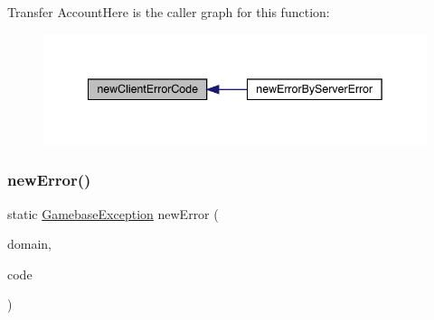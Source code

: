 Transfer AccountHere is the caller graph for this function\+:
\nopagebreak
\begin{figure}[H]
\begin{center}
\leavevmode
\includegraphics[width=342pt]{classcom_1_1toast_1_1android_1_1gamebase_1_1base_1_1_gamebase_error_ae1e31671405d6d3c4660aacf9d9dd3c5_icgraph}
\end{center}
\end{figure}
\mbox{\label{classcom_1_1toast_1_1android_1_1gamebase_1_1base_1_1_gamebase_error_a2d1d7646a1658d188ee9b65a25905661}} 
\subsubsection{\texorpdfstring{new\+Error()}{newError()}\hspace{0.1cm}{\footnotesize\ttfamily [1/2]}}
{\footnotesize\ttfamily static \hyperlink{classcom_1_1toast_1_1android_1_1gamebase_1_1base_1_1_gamebase_exception}{Gamebase\+Exception} new\+Error (\begin{DoxyParamCaption}\item[{@Non\+Null final String}]{domain,  }\item[{final int}]{code }\end{DoxyParamCaption})\hspace{0.3cm}{\ttfamily [static]}}

